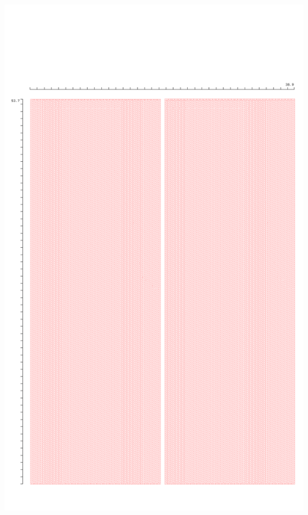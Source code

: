\documentclass[aspectratio=169]{beamer}
\begin{document}
\begin{frame}
\begin{columns}
    \begin{column}{0.5\textwidth}
      \begin{center}
        \includegraphics[width=\linewidth,height=0.85\textheight,keepaspectratio]{../images/cdac_array.png}
      \end{center}
    \end{column}
  \end{columns}

\end{frame}
\end{document}

